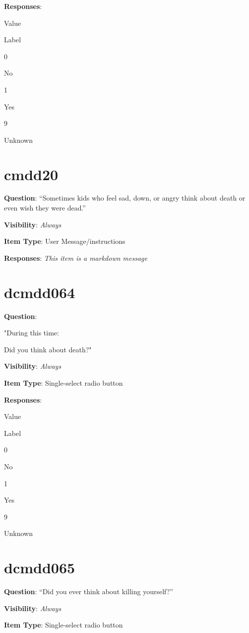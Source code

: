 \documentclass[]{book}
\begin{document}
\textbf{Responses}:

Value

Label

0

No

1

Yes

9

Unknown

\hypertarget{cmdd20}{%
\section{cmdd20}\label{cmdd20}}

\textbf{Question}: ``Sometimes kids who feel sad, down, or angry think about death or even wish they were dead.''

\textbf{Visibility}: \emph{Always}

\textbf{Item Type}: User Message/instructions

\textbf{Responses}: \emph{This item is a markdown message}

\hypertarget{dcmdd064}{%
\section{dcmdd064}\label{dcmdd064}}

\textbf{Question}:

"During this time:

Did you think about death?"

\textbf{Visibility}: \emph{Always}

\textbf{Item Type}: Single-select radio button

\textbf{Responses}:

Value

Label

0

No

1

Yes

9

Unknown

\hypertarget{dcmdd065}{%
\section{dcmdd065}\label{dcmdd065}}

\textbf{Question}: ``Did you ever think about killing yourself?''

\textbf{Visibility}: \emph{Always}

\textbf{Item Type}: Single-select radio button
\end{document}
